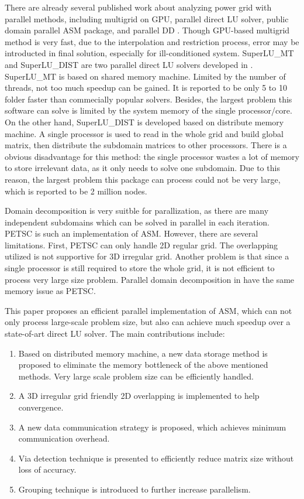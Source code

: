 \documentclass{sig-alternate}
\begin{document}
	There are already several published work about analyzing power grid with parallel methods, including multigrid on 
	GPU\cite{Zhuofeng}, parallel direct LU 
	solver\cite{Super_LU_website}, public domain parallel ASM package\cite{PETSC_website}, and parallel DD
	\cite{kaisun, voronov}. Though GPU-based multigrid method\cite{Zhuofeng} is very fast, due to the interpolation and restriction
	process, error may be
	introducted in final solution, especially for ill-conditioned system. SuperLU\_MT and SuperLU\_DIST are two parallel direct LU 
	solvers developed in \cite{Super_LU_website}. SuperLU\_MT is 
	based on shared memory machine. Limited by the number of threads, not too much speedup can be gained. 
	It is reported to be only 5 to 10 folder faster than commecially popular solvers\cite{Super_LU_website}. Besides, the largest 
	problem this software can solve is limited by the system memory of the single processor/core. On the other hand, SuperLU\_DIST 
	is developed based on distribute memory machine. A single processor is used to read in the whole grid and build global 
	matrix, then distribute the subdomain matrices to other processors. 
	There is a obvious disadvantage for this method: the single processor wastes a lot of memory to store irrelevant data, as 
	it only needs to solve one subdomain. Due to this reason, the largest problem this package can 
	process could not be very large, which is reported to be 2 million nodes\cite{Super_LU_website}.

	Domain decomposition is very suitble for parallization, as there are many independent subdomains which can be
	solved in parallel in each iteration. PETSC\cite{PETSC_website} is such an implementation of ASM.
	However, there are several limitations. First, PETSC can only handle 2D regular grid. 
	The overlapping utilized is not supportive for 3D irregular grid. Another problem is that since a single processor is 
	still required to
	store the whole grid, it is not efficient to process very large size problem. Parallel domain decomposition in \cite{kaisun, voronov} have
	the same memory issue as PETSC.
	
	This paper proposes an efficient parallel implementation of ASM, which can not only process large-scale problem size, 
	but also can achieve much speedup over a state-of-art direct LU solver. The main contributions include:
	\begin{enumerate}[1)]
	\item Based on distributed memory machine, a new data storage method is proposed to eliminate the memory bottleneck of
	the above mentioned methods. Very large scale problem size can be efficiently handled.
	\item A 3D irregular grid friendly 2D overlapping is implemented to help convergence. 
	\item A new data communication strategy is proposed, which achieves minimum communication overhead.
	\item Via detection technique is presented to efficiently reduce matrix size without loss of accuracy.
	\item Grouping technique is introduced to further increase parallelism.
	\end{enumerate}
\end{document}
